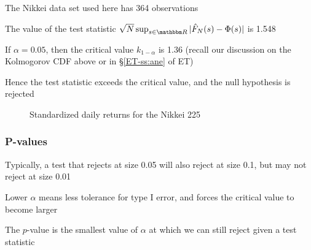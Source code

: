 \begin{frame}

    \vspace{2em}
    The Nikkei data set used here has 364 observations
    
    The value of the test statistic
    $\sqrt{N}\sup_{s \in \RR} |\hat F_N(s) - \Phi(s)|$ is 1.548
    
    If $\alpha =
    0.05$, then the critical value $k_{1-\alpha}$ is
    1.36 (recall our discussion on the Kolmogorov {\sc CDF} above or in \S\ref{ET-ss:ane} of ET)
    
    Hence the test statistic exceeds the critical value, and the null
    hypothesis is rejected
    
\end{frame}

\begin{frame}

    \begin{figure}
   \begin{center}
    \caption{\label{f:nikkei_hist} Standardized daily returns for the Nikkei 225}
   \end{center}
    \end{figure}
    
\end{frame}

\begin{frame}\frametitle{P-values}

    \vspace{2em}
    Typically, a test that rejects at size 0.05 will also reject at size 0.1, but
    may not reject at size 0.01
    
    Lower $\alpha$ means less tolerance for type I
    error, and forces the critical value to become larger 
    
    \vspace{.7em}
    The $p$-value is the smallest value of $\alpha$
    at which we can still reject given a test statistic
    
\end{frame}

